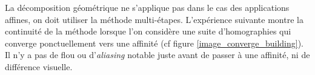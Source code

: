 
La décomposition géométrique ne s'applique pas dans le cas des applications affines,  on doit utiliser la méthode multi-étapes. L'expérience suivante montre la continuité de la méthode lorsque l'on considère une suite d'homographies qui converge ponctuellement vers une affinité (cf figure \ref{image_converge_building}). Il n'y a pas de flou ou d'\emph{aliasing} notable juste avant de passer à une affinité, ni de différence visuelle.

\begin{figure}[h!]
		\centering
\end{figure}

